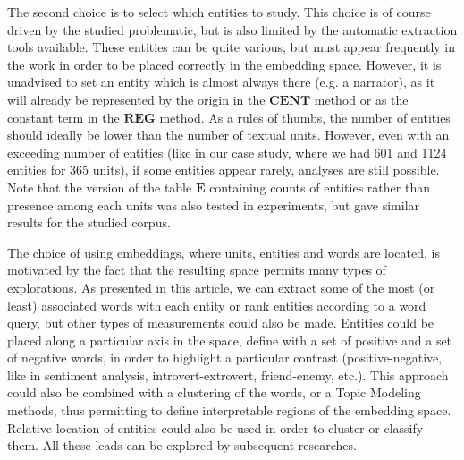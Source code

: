 \documentclass[
twocolumn,
]{ceurart}
\begin{document}
The second choice is to select which entities to study. This choice is of course driven by the studied problematic, but is also limited by the automatic extraction tools available. These entities can be quite various, but must appear frequently in the work in order to be placed correctly in the embedding space. However, it is unadvised to set an entity which is almost always there (e.g. a narrator), as it will already be represented by the origin in the $\mathbf{CENT}$ method or as the constant term in the $\mathbf{REG}$ method. As a rules of thumbs, the number of entities should ideally be lower than the number of textual units. However, even with an exceeding number of entities (like in our case study, where we had 601 and 1124 entities for 365 units), if some entities appear rarely, analyses are still possible. Note that the version of the table $\mathbf{E}$ containing counts of entities rather than presence among each units was also tested in experiments, but gave similar results for the studied corpus.

The choice of using embeddings, where units, entities and words are located, is motivated by the fact that the resulting space permits many types of explorations. As presented in this article, we can extract some of the most (or least) associated words with each entity or rank entities according to a word query, but other types of measurements could also be made. Entities could be placed along a particular axis in the space, define with a set of positive and a set of negative words, in order to highlight a particular contrast (positive-negative, like in sentiment analysis, introvert-extrovert, friend-enemy, etc.). This approach could also be combined with a clustering of the words, or a Topic Modeling methods, thus permitting to define interpretable regions of the embedding space. Relative location of entities could also be used in order to cluster or classify them. All these leads can be explored by subsequent researches.
\end{document}
